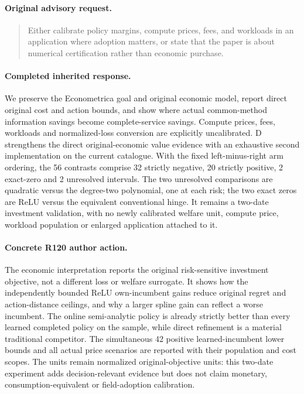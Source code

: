 \paragraph{Original advisory request.}
\begin{quote}
Either calibrate policy margins, compute prices, fees, and workloads in an application where adoption matters, or state that the paper is about numerical certification rather than economic purchase.
\end{quote}
\paragraph{Completed inherited response.}
We preserve the Econometrica goal and original economic model, report direct original cost and action bounds, and show where actual common-method information savings become complete-service savings. Compute prices, fees, workloads and normalized-loss conversion are explicitly uncalibrated. D strengthens the direct original-economic value evidence with an exhaustive second implementation on the current catalogue. With the fixed left-minus-right arm ordering, the 56 contrasts comprise 32 strictly negative, 20 strictly positive, 2 exact-zero and 2 unresolved intervals. The two unresolved comparisons are quadratic versus the degree-two polynomial, one at each risk; the two exact zeros are ReLU versus the equivalent conventional hinge. It remains a two-date investment validation, with no newly calibrated welfare unit, compute price, workload population or enlarged application attached to it.
\paragraph{Concrete R120 author action.}
The economic interpretation reports the original risk-sensitive investment objective, not a different loss or welfare surrogate. It shows how the independently bounded ReLU own-incumbent gains reduce original regret and action-distance ceilings, and why a larger spline gain can reflect a worse incumbent. The online semi-analytic policy is already strictly better than every learned completed policy on the sample, while direct refinement is a material traditional competitor. The simultaneous 42 positive learned-incumbent lower bounds and all actual price scenarios are reported with their population and cost scopes. The units remain normalized original-objective units: this two-date experiment adds decision-relevant evidence but does not claim monetary, consumption-equivalent or field-adoption calibration.

